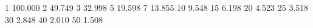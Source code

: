 1 100.000
2 49.749
3 32.998
5 19.598
7 13.855
10 9.548
15 6.198
20 4.523
25 3.518
30 2.848
40 2.010
50 1.508
